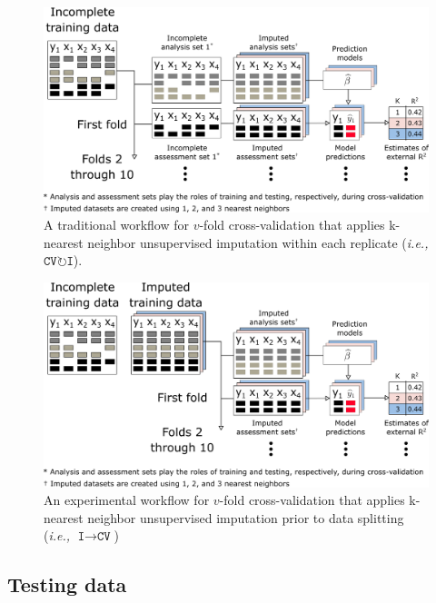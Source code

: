 \documentclass[AMA,STIX1COL,doublespace]{WileyNJD-v2}
\begin{document}
\begin{figure}
\includegraphics[width=1\linewidth]{figs/workflow_CVI} 
\caption{A traditional workflow for $v$-fold cross-validation that applies k-nearest neighbor unsupervised imputation within each replicate (\textit{i.e., }$\texttt{CV}\!\circlearrowright\!\texttt{I}$).}
\label{fig:workflow_cvi}
\end{figure}

\begin{figure}
\includegraphics[width=1\linewidth]{figs/workflow_ICV} 
\caption{An experimental workflow for $v$-fold cross-validation that applies k-nearest neighbor unsupervised imputation prior to data splitting (\textit{i.e., }$\texttt{I}\!\!\rightarrow\!\texttt{CV}$)}
\label{fig:workflow_icv}
\end{figure}

\subsection{Testing data} \label{subsec:testing_data}
\end{document}
